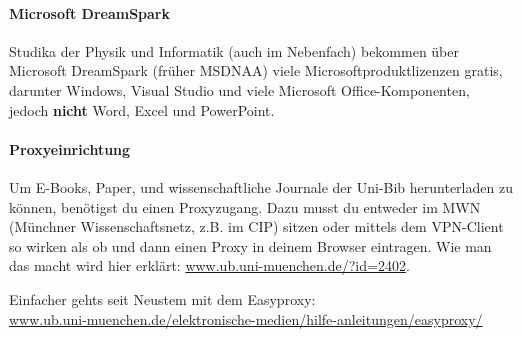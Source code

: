 \paragraph{Microsoft DreamSpark}
Studika der Physik und Informatik (auch im Nebenfach) bekommen über
Microsoft DreamSpark (früher MSDNAA) viele Microsoftproduktlizenzen
gratis, darunter Windows, Visual Studio und viele
Microsoft Office-Komponenten, jedoch \textbf{nicht} Word, Excel und PowerPoint.

\paragraph{Proxyeinrichtung}

Um E-Books, Paper, und wissenschaftliche Journale der Uni-Bib
herunterladen zu können, benötigst du einen Proxyzugang. Dazu musst du
entweder im MWN (Münchner Wissenschaftsnetz, z.B. im CIP) sitzen oder
mittels dem VPN-Client so wirken als ob und dann einen Proxy in deinem
Browser eintragen. Wie man das macht wird hier erklärt:
\url{www.ub.uni-muenchen.de/?id=2402}.

Einfacher gehts seit Neustem mit dem Easyproxy:\\
\url{www.ub.uni-muenchen.de/elektronische-medien/hilfe-anleitungen/easyproxy/}
